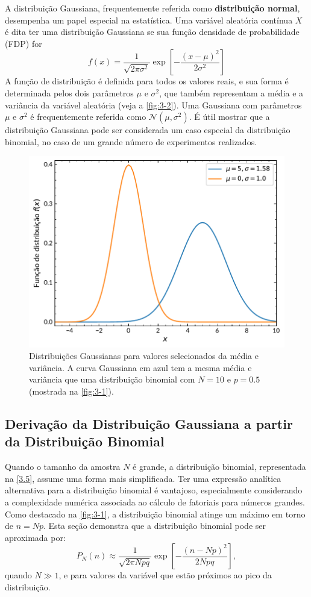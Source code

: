 A distribuição Gaussiana, frequentemente referida como \textbf{distribuição normal}, desempenha um papel especial na estatística. Uma variável aleatória contínua $X$ é dita ter uma distribuição Gaussiana se sua função densidade de probabilidade (FDP) for
\begin{equation}\label{3.8}
f(x) = \dfrac{1}{\sqrt{2\pi \sigma^2}} \exp\left[-\dfrac{(x-\mu)^2}{2\sigma^2}\right]
\end{equation}
A função de distribuição é definida para todos os valores reais, e sua forma é determinada pelos dois parâmetros $\mu$ e $\sigma^2$, que também representam a média e a variância da variável aleatória (veja a \autoref{fig:3-2}). Uma Gaussiana com parâmetros $\mu$ e $\sigma^2$ é frequentemente referida como $\mathcal{N}(\mu, \sigma^2)$. É útil mostrar que a distribuição Gaussiana pode ser considerada um caso especial da distribuição binomial, no caso de um grande número de experimentos realizados.

\begin{figure}
	\centering
	\includegraphics[width=0.7\linewidth]{Figuras/3-2.pdf}
	\caption{Distribuições Gaussianas para valores selecionados da média e variância. A curva Gaussiana em azul tem a mesma média e variância que uma distribuição binomial com $N = 10$ e $p = 0.5$ (mostrada na \autoref{fig:3-1}).}
	\label{fig:3-2}
\end{figure}

\subsection{Derivação da Distribuição Gaussiana a partir da Distribuição Binomial}

Quando o tamanho da amostra $N$ é grande, a distribuição binomial, representada na \autoref{3.5}, assume uma forma mais simplificada. Ter uma expressão analítica alternativa para a distribuição binomial é vantajoso, especialmente considerando a complexidade numérica associada ao cálculo de fatoriais para números grandes. Como destacado na \autoref{fig:3-1}, a distribuição binomial atinge um máximo em torno de $n = Np$. Esta seção demonstra que a distribuição binomial pode ser aproximada por:
\begin{equation}
P_N(n) \approx \dfrac{1}{\sqrt{2\pi Npq}}\exp\left[-\dfrac{(n-Np)^2}{2Npq}\right],
\end{equation}
quando $N \gg 1$, e para valores da variável que estão próximos ao pico da distribuição.

